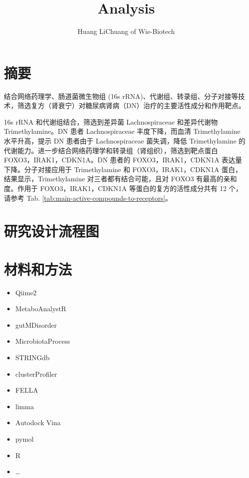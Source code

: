\documentclass[
]{article}
\title{Analysis}
\author{Huang LiChuang of Wie-Biotech}
\date{}
\providecommand{\tightlist}{%
  \setlength{\itemsep}{0pt}\setlength{\parskip}{0pt}}
\begin{document}
\maketitle

{
\setcounter{tocdepth}{3}
\tableofcontents
}
\listoffigures

\listoftables

\hypertarget{abstract}{%
\section{摘要}\label{abstract}}

结合网络药理学、肠道菌微生物组 (16s rRNA)、代谢组、转录组、分子对接等技术，筛选复方（肾衰宁）对糖尿病肾病（DN）治疗的主要活性成分和作用靶点。

16s rRNA 和代谢组结合，筛选到差异菌 Lachnospiraceae 和差异代谢物 Trimethylamine。DN 患者 Lachnospiraceae 丰度下降，而血清 Trimethylamine 水平升高，提示 DN 患者由于 Lachnospiraceae 菌失调，降低 Trimethylamine 的代谢能力。进一步结合网络药理学和转录组（肾组织），筛选到靶点蛋白 FOXO3，IRAK1，CDKN1A。DN 患者的 FOXO3，IRAK1，CDKN1A 表达量下降。分子对接应用于 Trimethylamine 和 FOXO3，IRAK1，CDKN1A 蛋白，结果显示，Trimethylamine 对三者都有结合可能，且对 FOXO3 有最高的亲和度。作用于 FOXO3，IRAK1，CDKN1A 等蛋白的复方的活性成分共有 12 个，请参考 Tab. \ref{tab:main-active-compounds-to-receptors}。

\hypertarget{route}{%
\section{研究设计流程图}\label{route}}

\hypertarget{methods}{%
\section{材料和方法}\label{methods}}

\begin{itemize}
\tightlist
\item
  Qiime2
\item
  MetaboAnalystR
\item
  gutMDisorder
\item
  MicrobiotaProcess
\item
  STRINGdb
\item
  clusterProfiler
\item
  FELLA
\item
  limma
\item
  Autodock Vina
\item
  pymol
\item
  R
\item
  \ldots{}
\end{itemize}
\end{document}
